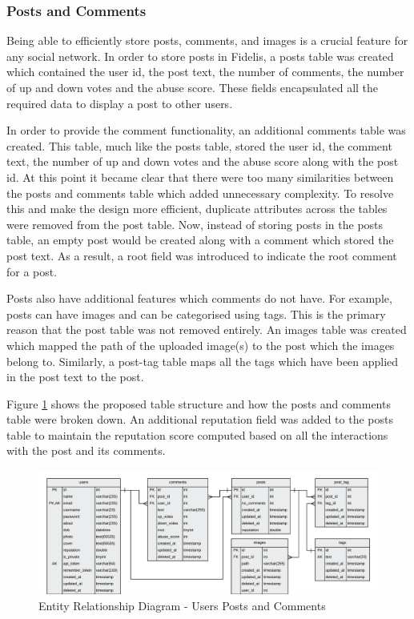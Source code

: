\subsubsection{Posts and Comments}
Being able to efficiently store posts, comments, and images is a crucial feature for any social network. In order to store posts in Fidelis, a posts table was created which contained the user id, the post text, the number of comments, the number of up and down votes and the abuse score. These fields encapsulated all the required data to display a post to other users.

In order to provide the comment functionality, an additional comments table was created. This table, much like the posts table, stored the user id, the comment text, the number of up and down votes and the abuse score along with the post id. At this point it became clear that there were too many similarities between the posts and comments table which added unnecessary complexity. To resolve this and make the design more efficient, duplicate attributes across the tables were removed from the post table. Now, instead of storing posts in the posts table, an empty post would be created along with a comment which stored the post text. As a result, a root field was introduced to indicate the root comment for a post.

Posts also have additional features which comments do not have. For example, posts can have images and can be categorised using tags. This is the primary reason that the post table was not removed entirely. An images table was created which mapped the path of the uploaded image(s) to the post which the images belong to. Similarly, a post-tag table maps all the tags which have been applied in the post text to the post.

Figure \ref{fig:ERD_Posts} shows the proposed table structure and how the posts and comments table were broken down. An additional reputation field was added to the posts table to maintain the reputation score computed based on all the interactions with the post and its comments.

\begin{figure}[H]
  \centering
  \includegraphics[width=1.0\textwidth]{Images/Design/Database/Posts}
  \caption{Entity Relationship Diagram - Users Posts and Comments} \label{fig:ERD_Posts}
\end{figure}

